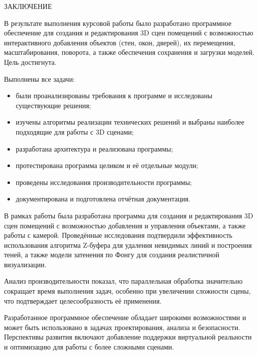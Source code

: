 \begin{center}
    \MakeUppercase{\large Заключение}
\end{center}

В результате выполнения курсовой работы было разработано программное обеспечение для создания и редактирования 3D сцен помещений с возможностью интерактивного добавления объектов (стен, окон, дверей), их перемещения, масштабирования, поворота, а также обеспечения сохранения и загрузки моделей. Цель достигнута.

\vspace{0.25cm}
Выполнены все задачи:

\begin{itemize}[label=---]

	\item были проанализированы требования к программе и исследованы существующие решения;
    
    \item изучены алгоритмы реализации технических решений и выбраны наиболее подходящие для работы с 3D сценами;
    
    \item разработана архитектура и реализована программы;
    
    \item протестирована программа целиком и её отдельные модули;
    
    \item проведены исследования производительности программы;
    
    \item документирована и подготовлена отчётная документация.

\end{itemize}


В рамках работы была разработана программа для создания и редактирования 3D сцен помещений с возможностью добавления и управления объектами, а также работы с камерой. Проведённые исследования подтвердили эффективность использования алгоритма Z-буфера для удаления невидимых линий и построения теней, а также модели затенения по Фонгу для создания реалистичной визуализации.

Анализ производительности показал, что параллельная обработка значительно сокращает время выполнения задач, особенно при увеличении сложности сцены, что подтверждает целесообразность её применения.

Разработанное программное обеспечение обладает широкими возможностями и может быть использовано в задачах проектирования, анализа и безопасности. Перспективы развития включают добавление поддержки виртуальной реальности и оптимизацию для работы с более сложными сценами.

\newpage